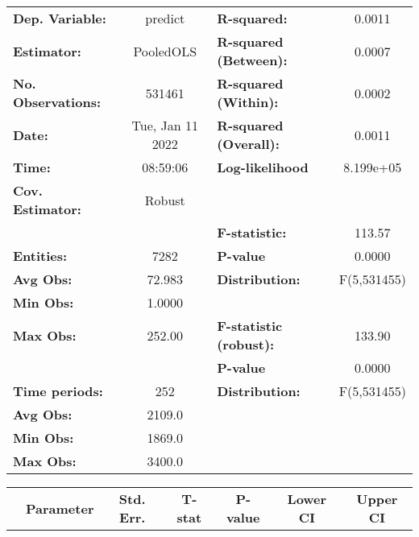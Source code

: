 \begin{center}
\begin{tabular}{lclc}
\toprule
\textbf{Dep. Variable:}    &      predict       & \textbf{  R-squared:         }   &      0.0011      \\
\textbf{Estimator:}        &     PooledOLS      & \textbf{  R-squared (Between):}  &      0.0007      \\
\textbf{No. Observations:} &       531461       & \textbf{  R-squared (Within):}   &      0.0002      \\
\textbf{Date:}             &  Tue, Jan 11 2022  & \textbf{  R-squared (Overall):}  &      0.0011      \\
\textbf{Time:}             &      08:59:06      & \textbf{  Log-likelihood     }   &    8.199e+05     \\
\textbf{Cov. Estimator:}   &       Robust       & \textbf{                     }   &                  \\
\textbf{}                  &                    & \textbf{  F-statistic:       }   &      113.57      \\
\textbf{Entities:}         &        7282        & \textbf{  P-value            }   &      0.0000      \\
\textbf{Avg Obs:}          &       72.983       & \textbf{  Distribution:      }   &   F(5,531455)    \\
\textbf{Min Obs:}          &       1.0000       & \textbf{                     }   &                  \\
\textbf{Max Obs:}          &       252.00       & \textbf{  F-statistic (robust):} &      133.90      \\
\textbf{}                  &                    & \textbf{  P-value            }   &      0.0000      \\
\textbf{Time periods:}     &        252         & \textbf{  Distribution:      }   &   F(5,531455)    \\
\textbf{Avg Obs:}          &       2109.0       & \textbf{                     }   &                  \\
\textbf{Min Obs:}          &       1869.0       & \textbf{                     }   &                  \\
\textbf{Max Obs:}          &       3400.0       & \textbf{                     }   &                  \\
\bottomrule
\end{tabular}
\begin{tabular}{lcccccc}
                & \textbf{Parameter} & \textbf{Std. Err.} & \textbf{T-stat} & \textbf{P-value} & \textbf{Lower CI} & \textbf{Upper CI}  \\

\end{tabular}
\end{center}
